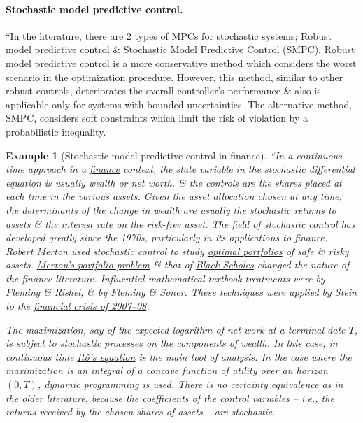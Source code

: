 \documentclass{article}
\newtheorem{example}{Example}
\begin{document}
\paragraph{Stochastic model predictive control.} ``In the literature, there are 2 types of MPCs for stochastic systems; Robust model predictive control \& Stochastic Model Predictive Control (SMPC). Robust model predictive control is a more conservative method which considers the worst scenario in the optimization procedure. However, this method, similar to other robust controls, deteriorates the overall controller's performance \& also is applicable only for systems with bounded uncertainties. The alternative method, SMPC, considers soft constraints which limit the risk of violation by a probabilistic inequality.

\begin{example}[Stochastic model predictive control in finance]
	``In a continuous time approach in a \href{https://en.wikipedia.org/wiki/Finance}{finance} context, the state variable in the stochastic differential equation is usually wealth or net worth, \& the controls are the shares placed at each time in the various assets. Given the \href{https://en.wikipedia.org/wiki/Asset_allocation}{asset allocation} chosen at any time, the determinants of the change in wealth are usually the stochastic returns to assets \& the interest rate on the risk-free asset. The field of stochastic control has developed greatly since the 1970s, particularly in its applications to finance. Robert Merton used stochastic control to study \href{https://en.wikipedia.org/wiki/Optimal_portfolio}{optimal portfolios} of safe \& risky assets. \href{https://en.wikipedia.org/wiki/Merton%27s_portfolio_problem}{Merton's portfolio problem} \& that of \href{https://en.wikipedia.org/wiki/Black%E2%80%93Scholes_model}{Black Scholes} changed the nature of the finance literature. Influential mathematical textbook treatments were by Fleming \& Rishel, \& by Fleming \& Soner. These techniques were applied by Stein to the \href{https://en.wikipedia.org/wiki/Financial_crisis_of_2007%E2%80%9308}{financial crisis of 2007--08}.
	
	The maximization, say of the expected logarithm of net work at a terminal date $T$, is subject to stochastic processes on the components of wealth. In this case, in continuous time \href{https://en.wikipedia.org/wiki/It%C3%B4%27s_lemma}{It\^o's equation} is the main tool of analysis. In the case where the maximization is an integral of a concave function of utility over an horizon $(0,T)$, dynamic programming is used. There is no certainty equivalence as in the older literature, because the coefficients of the control variables -- i.e., the returns received by the chosen shares of assets -- are stochastic.
\end{example}
\end{document}

